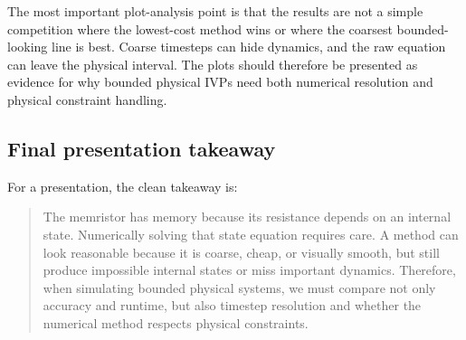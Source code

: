 \documentclass[11pt]{article}
\begin{document}
The most important plot-analysis point is that the results are not a simple competition where the lowest-cost method wins or where the coarsest bounded-looking line is best. Coarse timesteps can hide dynamics, and the raw equation can leave the physical interval. The plots should therefore be presented as evidence for why bounded physical IVPs need both numerical resolution and physical constraint handling.

\subsection{Final presentation takeaway}

For a presentation, the clean takeaway is:
\begin{quote}
The memristor has memory because its resistance depends on an internal state. Numerically solving that state equation requires care. A method can look reasonable because it is coarse, cheap, or visually smooth, but still produce impossible internal states or miss important dynamics. Therefore, when simulating bounded physical systems, we must compare not only accuracy and runtime, but also timestep resolution and whether the numerical method respects physical constraints.
\end{quote}
\end{document}
